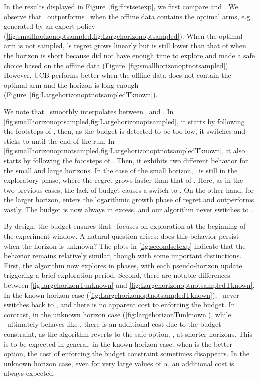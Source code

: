 In the results displayed in Figure~\ref{fig:firstsetexp}, we first compare \algucb and \alglcb. We observe that \alglcb\ outperforms \algucb\ when the offline data contains the optimal arms, e.g., generated by an expert policy (\cref{fig:smallhorizonoptsampled,fig:Largehorizonoptsampled}). When the optimal arm is not sampled, \alglcb's regret grows linearly but is still lower than that of \algucb when the horizon is short because \algucb did not have enough time to explore and \alglcb made a safe choice based on the offline data (Figure~\ref{fig:smallhorizonoptnotsampled}). However, UCB performs better when the offline data does not contain the optimal arm and the horizon is long enough (Figure~\ref{fig:LargehorizonoptnotsampledTknown}). 

We note that \algoname\ smoothly interpolates between \alglcb\ and \algucb. In \cref{fig:smallhorizonoptsampled,fig:Largehorizonoptsampled}, it starts by following the footsteps of \algucb, then, as the budget is detected to be too low, it switches and sticks to \alglcb until the end of the run. In \cref{fig:smallhorizonoptnotsampled,fig:LargehorizonoptnotsampledTknown}, it also starts by following the footsteps of \algucb. Then, it exhibits two different behavior for the small and large horizons. In the case of the small horizon, \algucb\ is still in the exploratory phase, where the regret grows faster than that of \alglcb. Here, as in the two previous cases, the lack of budget causes a switch to \alglcb. On the other hand, for the larger horizon, \algucb enters the logarithmic growth phase of regret and outperforms \alglcb vastly. The budget is now always in excess, and our algorithm never switches to \alglcb.


By design, the budget ensures that \algoname\ focuses on exploration at the beginning of the experiment window. A natural question arises: does this behavior persist when the horizon is unknown? The plots in \cref{fig:secondsetexp} indicate that the behavior remains relatively similar, though with some important distinctions. First, the algorithm now explores in phases, with each pseudo-horizon update triggering a brief exploration period. Second, there are notable differences between \cref{fig:largehorizonTunknown} and \cref{fig:LargehorizonoptnotsampledTknown}. In the known horizon case (\cref{fig:LargehorizonoptnotsampledTknown}), \algoname\ never switches back to \alglcb, and there is no apparent cost to enforcing the budget. In contrast, in the unknown horizon case (\cref{fig:largehorizonTunknown}), while \algoname\ ultimately behaves like \algucb, there is an additional cost due to the budget constraint, as the algorithm reverts to the safe option, \alglcb, at shorter horizons.
This is to be expected in general: in the known horizon case, when \algucb is the better option, the cost of enforcing the budget constraint sometimes disappears. In the unknown horizon case, even for very large values of $\alpha$, an additional cost is always expected.




